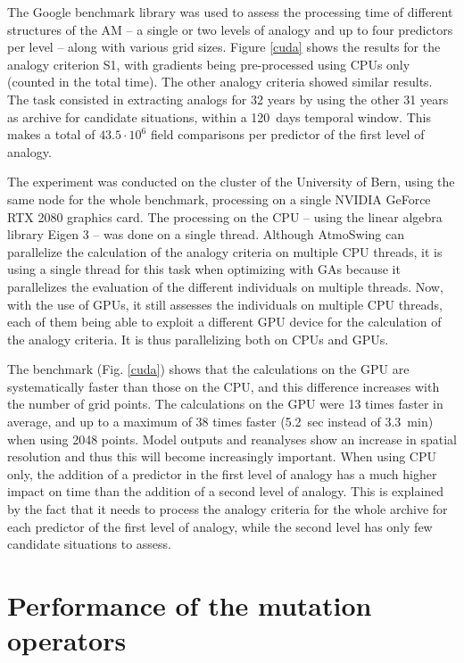 \documentclass[draft]{agujournal2019}
\begin{document}
The Google benchmark library was used to assess the processing time of different structures of the AM -- a single or two levels of analogy and up to four predictors per level -- along with various grid sizes. Figure \ref{cuda} shows the results for the analogy criterion S1, with gradients being pre-processed using CPUs only (counted in the total time). The other analogy criteria showed similar results. The task consisted in extracting analogs for 32 years by using the other 31 years as archive for candidate situations, within a 120~days temporal window. This makes a total of $43.5\cdot10^6$ field comparisons per predictor of the first level of analogy.

The experiment was conducted on the cluster of the University of Bern, using the same node for the whole benchmark, processing on a single NVIDIA GeForce RTX 2080 graphics card. The processing on the CPU -- using the linear algebra library Eigen 3 \cite{Guennebaud2010} -- was done on a single thread. Although AtmoSwing can parallelize the calculation of the analogy criteria on multiple CPU threads, it is using a single thread for this task when optimizing with GAs because it parallelizes the evaluation of the different individuals on multiple threads. Now, with the use of GPUs, it still assesses the individuals on multiple CPU threads, each of them being able to exploit a different GPU device for the calculation of the analogy criteria. It is thus parallelizing both on CPUs and GPUs.

The benchmark (Fig. \ref{cuda}) shows that the calculations on the GPU are systematically faster than those on the CPU, and this difference increases with the number of grid points. The calculations on the GPU were 13 times faster in average, and up to a maximum of 38 times faster (5.2~sec instead of 3.3~min) when using 2048 points. Model outputs and reanalyses show an increase in spatial resolution and thus this will become increasingly important. When using CPU only, the addition of a predictor in the first level of analogy has a much higher impact on time than the addition of a second level of analogy. This is explained by the fact that it needs to process the analogy criteria for the whole archive for each predictor of the first level of analogy, while the second level has only few candidate situations to assess.



\section{Performance of the mutation operators}
\end{document}
